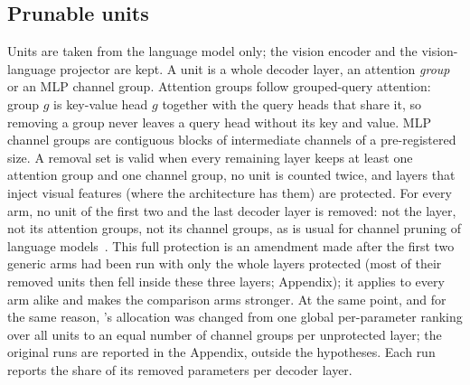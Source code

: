 \subsection{Prunable units}
Units are taken from the language model only; the vision encoder and the
vision-language projector are kept. A unit is a whole decoder layer, an attention
\emph{group} or an MLP channel group. Attention groups follow grouped-query
attention: group $g$ is key-value head $g$ together with the query heads that share
it, so removing a group never leaves a query head without its key and value. MLP
channel groups are contiguous blocks of intermediate channels of a pre-registered
size. A removal set is valid when every remaining layer keeps at least one attention
group and one channel group, no unit is counted twice, and layers that inject
visual features (where the architecture has them) are protected. For every arm, no
unit of the first two and the last decoder layer is removed: not the layer, not its
attention groups, not its channel groups, as is usual for channel pruning of language
models~\cite{ma2023llmpruner}. This full protection is an amendment made after the
first two generic arms had been run with only the whole layers protected (most of
their removed units then fell inside these three layers; Appendix); it applies to
every arm alike and makes the comparison arms stronger. At the same point, and for the
same reason, 's allocation was changed from one global per-parameter ranking
over all units to an equal number of channel groups per unprotected layer; the original
 runs are reported in the Appendix, outside the hypotheses. Each run reports
the share of its removed parameters per decoder layer.

